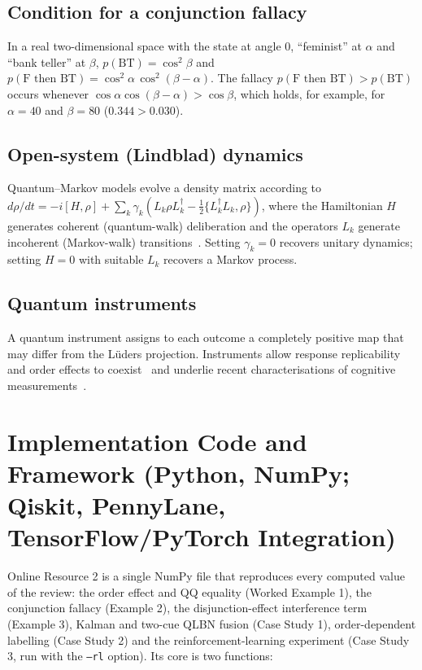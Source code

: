 \documentclass[pdflatex,sn-basic]{sn-jnl}
\begin{document}
\begin{appendices}
\subsection{Condition for a conjunction fallacy}\label{app:conj}
In a real two-dimensional space with the state at angle 0, ``feminist'' at $\alpha$ and ``bank teller'' at $\beta$, $p(\text{BT}) = \cos^2\beta$ and $p(\text{F then BT}) = \cos^2\alpha\,\cos^2(\beta - \alpha)$. The fallacy $p(\text{F then BT}) > p(\text{BT})$ occurs whenever $\cos\alpha\cos(\beta - \alpha) > \cos\beta$, which holds, for example, for $\alpha = 40$\textdegree{} and $\beta = 80$\textdegree{} ($0.344 > 0.030$).

\subsection{Open-system (Lindblad) dynamics}\label{app:lindblad}
Quantum--Markov models evolve a density matrix according to $d\rho/dt = -i[H, \rho] + \sum_k \gamma_k \left(L_k \rho L_k^{\dagger} - \tfrac{1}{2}\{L_k^{\dagger}L_k, \rho\}\right)$, where the Hamiltonian $H$ generates coherent (quantum-walk) deliberation and the operators $L_k$ generate incoherent (Markov-walk) transitions~\citep{Busemeyer2020,Asano2026}. Setting $\gamma_k = 0$ recovers unitary dynamics; setting $H = 0$ with suitable $L_k$ recovers a Markov process.

\subsection{Quantum instruments}\label{app:instr}
A quantum instrument assigns to each outcome a completely positive map that may differ from the L\"uders projection. Instruments allow response replicability and order effects to coexist~\citep{Ozawa2020,Ozawa2021} and underlie recent characterisations of cognitive measurements~\citep{Fuyama2025}.


\section{Implementation Code and Framework (Python, NumPy; Qiskit, PennyLane, TensorFlow/PyTorch Integration)}\label{app:code}
Online Resource 2 is a single NumPy file that reproduces every computed value of the review: the order effect and QQ equality (Worked Example 1), the conjunction fallacy (Example 2), the disjunction-effect interference term (Example 3), Kalman and two-cue QLBN fusion (Case Study 1), order-dependent labelling (Case Study 2) and the reinforcement-learning experiment (Case Study 3, run with the \texttt{--rl} option). Its core is two functions:


\end{appendices}
\end{document}
